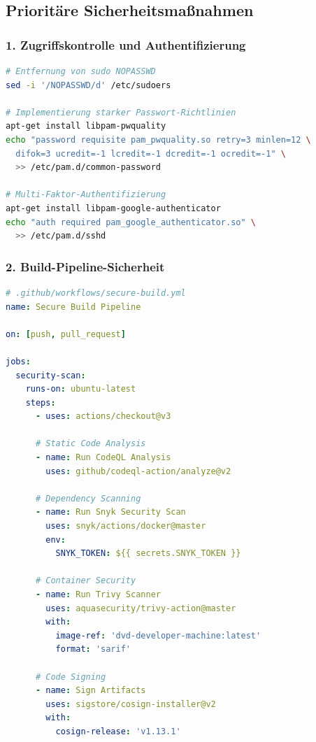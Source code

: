 \documentclass[11pt,a4paper]{article}
\begin{document}
\subsection{Prioritäre Sicherheitsmaßnahmen}

\subsubsection{1. Zugriffskontrolle und Authentifizierung}

\begin{lstlisting}[language=bash, caption=Sichere Benutzer-Konfiguration]
# Entfernung von sudo NOPASSWD
sed -i '/NOPASSWD/d' /etc/sudoers

# Implementierung starker Passwort-Richtlinien
apt-get install libpam-pwquality
echo "password requisite pam_pwquality.so retry=3 minlen=12 \
  difok=3 ucredit=-1 lcredit=-1 dcredit=-1 ocredit=-1" \
  >> /etc/pam.d/common-password

# Multi-Faktor-Authentifizierung
apt-get install libpam-google-authenticator
echo "auth required pam_google_authenticator.so" \
  >> /etc/pam.d/sshd
\end{lstlisting}

\subsubsection{2. Build-Pipeline-Sicherheit}

\begin{lstlisting}[language=yaml, caption=Sichere CI/CD-Pipeline]
# .github/workflows/secure-build.yml
name: Secure Build Pipeline

on: [push, pull_request]

jobs:
  security-scan:
    runs-on: ubuntu-latest
    steps:
      - uses: actions/checkout@v3
      
      # Static Code Analysis
      - name: Run CodeQL Analysis
        uses: github/codeql-action/analyze@v2
        
      # Dependency Scanning
      - name: Run Snyk Security Scan
        uses: snyk/actions/docker@master
        env:
          SNYK_TOKEN: ${{ secrets.SNYK_TOKEN }}
          
      # Container Security
      - name: Run Trivy Scanner
        uses: aquasecurity/trivy-action@master
        with:
          image-ref: 'dvd-developer-machine:latest'
          format: 'sarif'
          
      # Code Signing
      - name: Sign Artifacts
        uses: sigstore/cosign-installer@v2
        with:
          cosign-release: 'v1.13.1'
\end{lstlisting}
\end{document}

